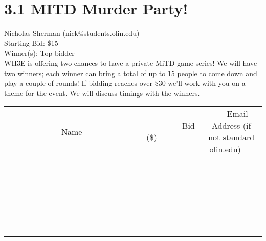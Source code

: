 \documentclass[11pt]{article}
\begin{document}
		
					\section*{3.1 MITD Murder Party!}
					Nicholas Sherman (nick@students.olin.edu) \\
					Starting Bid: \$15 \\
					Winner(s): Top bidder \\
					WH3E is offering two chances to have a private MiTD game series! We will have two winners; each winner can bring a total of up to 15 people to come down and play a couple of rounds! If bidding reaches over \$30 we'll work with you on a theme for the event. We will discuss timings with the winners. \\
					[6ex]
					\begin{tabular}{c c c}
						~~~~~~~~~~~~~Name~~~~~~~~~~~~~ & ~~~~~~~~~Bid (\$)~~~~~~~~~ & ~~~Email Address (if not standard olin.edu)~~~ \\
				
 & & \\
\hline
 & & \\
\hline
 & & \\
\hline
 & & \\
\hline
 & & \\
\hline
 & & \\
\hline
 & & \\
\hline
 & & \\
\hline
 & & \\
\hline
 & & \\
\hline
 & & \\
\hline
 & & \\
\hline
 & & \\
\hline
 & & \\
\hline
 & & \\
\hline
 & & \\
\hline
 & & \\
\hline
 & & \\
\hline
 & & \\
\hline
 & & \\
\hline
 & & \\
\hline
 & & \\
\hline
 & & \\
\hline
 & & \\
\hline
 & & \\
\hline
 & & \\
\hline
					\end{tabular}
					\clearpage
				
\end{document}
